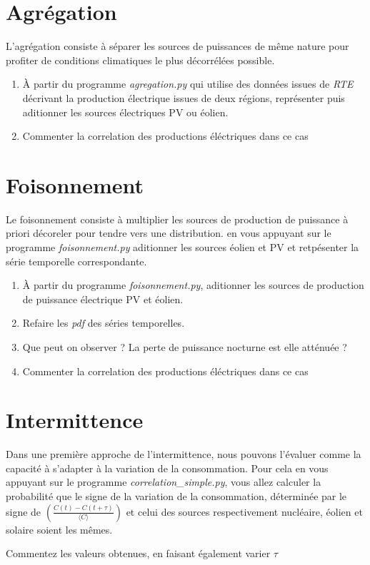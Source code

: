 \documentclass{article}
\newcommand{\tmtextit}[1]{{\itshape{#1}}}
\begin{document}
\section{Agrégation}

L'agrégation consiste à séparer les sources de puissances de même nature
pour profiter de conditions climatiques le plus décorrélées possible.
\begin{enumerate}
  \item À partir du programme \tmtextit{agregation.py} qui utilise des
  données issues de \tmtextit{RTE} décrivant la production électrique
  issues de deux régions, représenter puis aditionner les sources
  électriques PV ou éolien.
  
  \item Commenter la correlation des productions éléctriques dans ce cas
\end{enumerate}

\section{Foisonnement}

Le foisonnement consiste à multiplier les sources de production de puissance
à priori décoreler pour tendre vers une distribution. en vous appuyant sur
le programme \tmtextit{foisonnement.py} aditionner les sources éolien et PV
et retpésenter la série temporelle correspondante.
\begin{enumerate}
  \item À partir du programme \tmtextit{foisonnement.py}, aditionner les
  sources de production de puissance électrique PV et éolien.
  
  \item Refaire les \tmtextit{pdf} des séries temporelles.
  
  \item Que peut on observer ? La perte de puissance nocturne est elle
  atténuée ?
  
  \item Commenter la correlation des productions éléctriques dans ce cas
\end{enumerate}

\section{Intermittence}

Dans une première approche de l'intermittence, nous pouvons l'évaluer comme
la capacité à s'adapter à la variation de la consommation. Pour cela en
vous appuyant sur le programme \tmtextit{correlation\_simple.py}, vous allez
calculer la probabilité que le signe de la variation de la consommation,
déterminée par le signe de $\left( \frac{C (t) - C (t + \tau)}{\langle C
\rangle} \right)$ et celui des sources respectivement nucléaire, éolien et
solaire soient les mêmes.

Commentez les valeurs obtenues, en faisant également varier $\tau$

\
\end{document}
